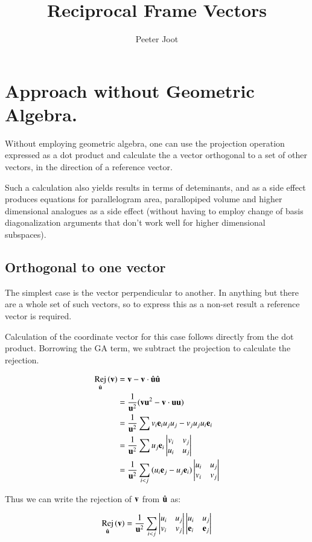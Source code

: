 \documentclass{article}      %
\title{ Reciprocal Frame Vectors } %
\author{Peeter Joot}         %
\DeclareMathOperator{\RejName}{Rej}
\newcommand{\Rej}[2]{\RejName_{#1}\left( {#2} \right)}
\begin{document}

\maketitle{}

\section{ Approach without Geometric Algebra. }

Without employing geometric algebra, one can use the projection
operation expressed as a dot product and calculate the a vector
orthogonal to a set of other vectors, in the direction of a reference
vector.

Such a calculation also yields  results in terms of deteminants, and as a side
effect produces equations for
parallelogram area, parallopiped volume and higher dimensional analogues as a side effect
(without having to employ change of basis diagonalization arguments that don't work well
for higher dimensional subspaces).

\subsection{ Orthogonal to one vector }

The simplest case is the vector perpendicular to another.  In anything
but  there are a whole set of such vectors, so to express this as a
non-set result a reference vector is required.

Calculation of the coordinate vector for this case follows directly from
the dot product.  Borrowing the GA term, we subtract the projection
to calculate the rejection.

\begin{align*}
\Rej{\ucap}{\Bv}
&= \Bv - \Bv \cdot \ucap \ucap \\
&= \inv{\Bu^2}(\Bv\Bu^2 - \Bv \cdot \Bu \Bu) \\
&= \inv{\Bu^2}\sum{v_i\Be_i u_j u_j - v_j u_j u_i \Be_i} \\
&= \inv{\Bu^2}\sum{u_j\Be_i\DETuvij{v}{u}{i}{j}} \\
&= \inv{\Bu^2}\sum_{i<j}{(u_i \Be_j -u_j\Be_i)\DETuvij{u}{v}{i}{j}} \\
\end{align*}

Thus we can write the rejection of $\mathbf{v}$ from $\hat{\mathbf{u}}$ as:

\begin{equation}\label{eqn:rejonevector}
\Rej{\ucap}{\Bv} = \inv{\Bu^2}\sum_{i<j}\DETuvij{u}{v}{i}{j}\DETuvij{u}{\Be}{i}{j}
\end{equation}
\end{document}
